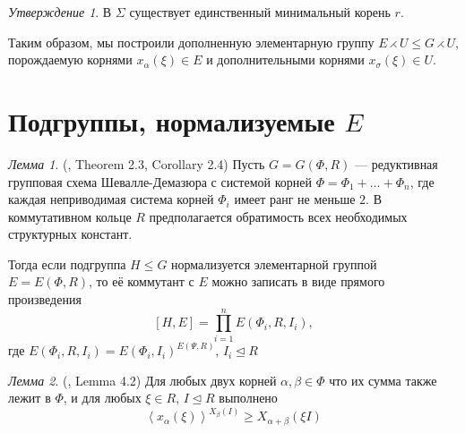 \documentclass[15pt]{article}
\theoremstyle{remark}
\newtheorem{prop}{Утверждение}
\newtheorem{lm}{Лемма}
\begin{document}
\begin{prop}
  В $\Sigma$ существует единственный минимальный корень $r$.
\end{prop}

Таким образом, мы построили дополненную элементарную группу $E \rightthreetimes U \le G \rightthreetimes U$, порождаемую корнями $x_\alpha(\xi) \in E$ и дополнительными корнями $x_\sigma(\xi) \in U$.

\section{Подгруппы, нормализуемые $E$}

\begin{lm}(\citep{Stavrova2009}, Theorem 2.3, Corollary 2.4)
  \label{directproduct}
  Пусть $G = G(\Phi, R)$ --- редуктивная групповая схема Шевалле-Демазюра
  с системой корней $\Phi = \Phi_1 + \ldots + \Phi_n$, где каждая неприводимая система корней $\Phi_i$ имеет ранг не меньше $2$. В коммутативном кольце $R$ предполагается обратимость всех необходимых структурных констант.
  
  Тогда если подгруппа $H \le G$ нормализуется элементарной группой $E = E(\Phi,R)$, то её коммутант с $E$ можно записать в виде прямого произведения
  $$ [H, E] = \prod_{i=1}^n E(\Phi_i,R,I_i), $$
  где $E(\Phi_i,R,I_i) = E(\Phi_i,I_i)^{E(\Psi,R)}$, $I_i \trianglelefteq R$
\end{lm}

\begin{lm}(\citep{Stavrova2009}, Lemma 4.2)
  \label{transitivity}
  Для любых двух корней $\alpha, \beta \in \Phi$ что их сумма также лежит в $\Phi$, и для любых  $\xi \in R$, $I \trianglelefteq R$ выполнено
  $$ \left< x_\alpha(\xi) \right>^{X_\beta(I)} \ge X_{\alpha + \beta}(\xi I) $$  
\end{lm}
\end{document}
